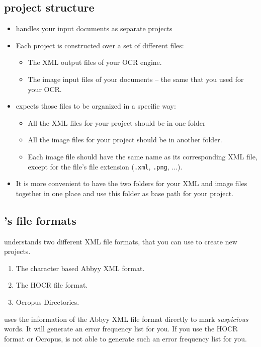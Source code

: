 \subsection{\pocoto{} project structure}
\begin{frame}
	\begin{itemize}
		\item \pocoto{} handles your input documents as separate projects
		\item Each project is constructed over a set of different files:
			\begin{itemize}
				\item The XML output files of your OCR engine.
				\item The image input files of your documents -- the same that you
					used for your OCR.
			\end{itemize}
		\item \pocoto{} expects those files to be organized in a specific way:
			\begin{itemize}
				\item All the XML files for your project should be in one folder
				\item All the image files for your project should be in another
					folder.
				\item Each image file should have the same name as its corresponding
					XML
					file, except for the file's file extension (\texttt{.xml},
					\texttt{.png}, ...).
			\end{itemize}
		\item It is more convenient to have the two folders for your XML and image
			files together in one place and use this folder as base path for
			your project.
	\end{itemize}
\end{frame}

\subsection{\pocoto{}'s file formats}
\begin{frame}
	\pocoto{} understands two different XML file formats, that you can use
	to create new projects.
	\begin{enumerate}
		\item The character based Abbyy XML format.
		\item The HOCR file format.
		\item Ocropus-Directories.
	\end{enumerate}
	\pocoto{} uses the information of the Abbyy XML file format directly to mark
	\emph{suspicious} words. It will generate an error frequency list for you. If
	you use the HOCR format or Ocropus, \pocoto{} is not able to generate such an
	error frequency list for you.
\end{frame}

